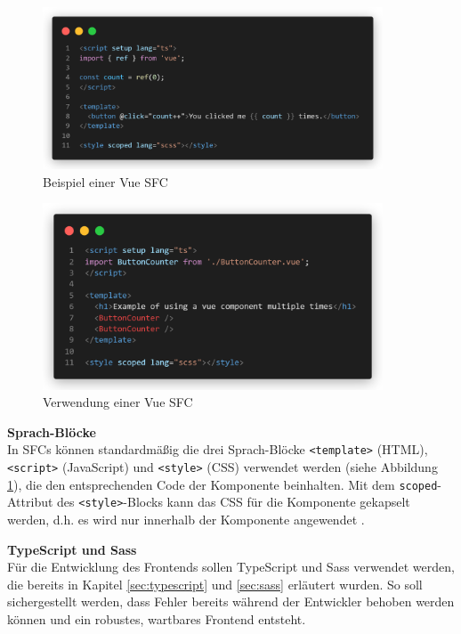 \begin{figure}[!htb]
  \includegraphics[width=0.9\textwidth]{images/vue-example.png}
  \centering
  \caption[Beispiel einer Vue-Komponente]{Beispiel einer Vue \ac{SFC} \cite{VueComponentBasics}}
  \label{fig:vue-example}
\end{figure}

\begin{figure}[!htb]
  \includegraphics[width=0.9\textwidth]{images/vue-example-usage.png}
  \centering
  \caption[Verwendung einer Vue-Komponente]{Verwendung einer Vue \ac{SFC} \cites[vgl.][]{VueComponentBasics}[vgl.][]{VueSFC}}
  \label{fig:vue-example-usage}
\end{figure}

\textbf{Sprach-Blöcke} \\
In \acp{SFC} können standardmäßig die drei Sprach-Blöcke \lstinline{<template>} (HTML), \lstinline{<script>} (JavaScript) und \lstinline{<style>} (CSS) verwendet werden (siehe Abbildung \ref{fig:vue-example}), die den entsprechenden Code der Komponente beinhalten. Mit dem \lstinline{scoped}-Attribut des \lstinline{<style>}-Blocks kann das CSS für die Komponente gekapselt werden, d.h. es wird nur innerhalb der Komponente angewendet \cite[vgl.][]{VueSFC}.

\textbf{TypeScript und Sass} \\
Für die Entwicklung des Frontends sollen TypeScript und Sass verwendet werden, die bereits in Kapitel \ref{sec:typescript} und \ref{sec:sass} erläutert wurden. So soll sichergestellt werden, dass Fehler bereits während der Entwickler behoben werden können und ein robustes, wartbares Frontend entsteht.

